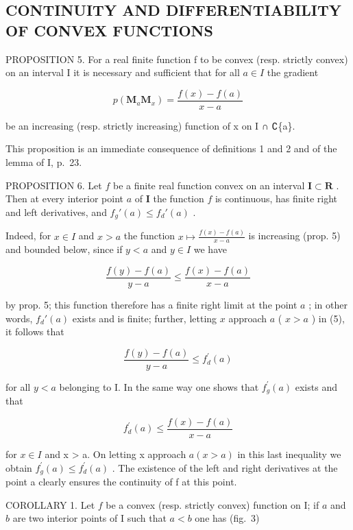 \subsection{CONTINUITY AND DIFFERENTIABILITY OF CONVEX FUNCTIONS}

PROPOSITION 5. For a real finite function f to be convex (resp. strictly convex) on an interval I it is necessary and sufficient that for all \(a \in I\) the gradient

\[
p (\mathbf {M} _ {a} \mathbf {M} _ {x}) = \frac {f (x) - f (a)}{x - a}
\]

be an increasing (resp. strictly increasing) function of x on I ∩ ∁\{a\}.

This proposition is an immediate consequence of definitions 1 and 2 and of the lemma of I, p.~23.

PROPOSITION 6. Let \(f\) be a finite real function convex on an interval \(\mathbf{I} \subset \mathbf{R}\) . Then at every interior point \(a\) of \(\mathbf{I}\) the function \(f\) is continuous, has finite right and left derivatives, and \(f_g'(a) \leqslant f_d'(a)\) .

Indeed, for \(x \in I\) and \(x > a\) the function \(x \mapsto \frac{f(x) - f(a)}{x - a}\) is increasing (prop. 5) and bounded below, since if \(y < a\) and \(y \in I\) we have

\[
\frac {f (y) - f (a)}{y - a} \leqslant \frac {f (x) - f (a)}{x - a}\tag{5}
\]

by prop. 5; this function therefore has a finite right limit at the point \(a\) ; in other words, \(f_d'(a)\) exists and is finite; further, letting \(x\) approach \(a\) ( \(x > a\) ) in (5), it follows that

\[
\frac {f (y) - f (a)}{y - a} \leqslant f _ {d} ^ {\prime} (a)\tag{6}
\]

for all \(y < a\) belonging to I. In the same way one shows that \(f_{g}^{\prime}(a)\) exists and that

\[
f _ {d} ^ {\prime} (a) \leqslant \frac {f (x) - f (a)}{x - a}\tag{7}
\]

for \(x \in I\) and x \textgreater{} a. On letting x approach \(a (x > a)\) in this last inequality we obtain \(f_{g}^{\prime}(a) \leqslant f_{d}^{\prime}(a)\) . The existence of the left and right derivatives at the point a clearly ensures the continuity of f at this point.

COROLLARY 1. Let \(f\) be a convex (resp. strictly convex) function on I; if \(a\) and \(b\) are two interior points of I such that \(a < b\) one has (fig.~3)

